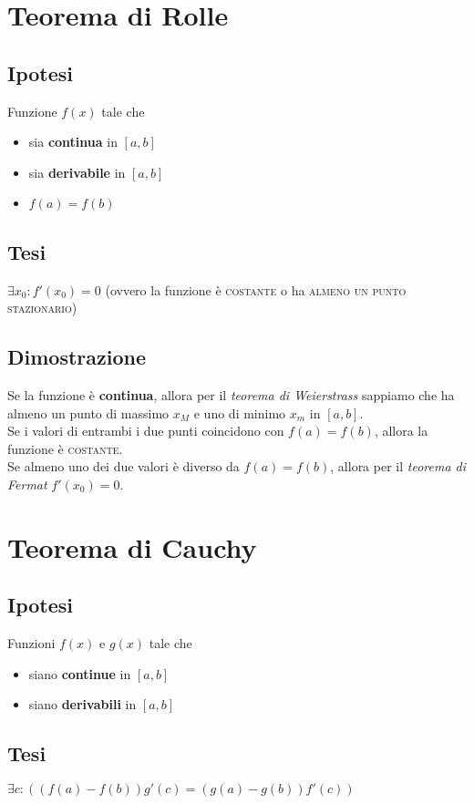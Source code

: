 \documentclass{article}
\begin{document}
\section{Teorema di Rolle}

\begin{multicols}{2}
    \subsection{Ipotesi}
    Funzione \(f(x)\) tale che
    \begin{itemize}
        \item sia \textbf{continua} in \([a, b]\)
        \item sia \textbf{derivabile} in \([a, b]\)
        \item \(f(a) = f(b)\)    
    \end{itemize}
\columnbreak
    \subsection{Tesi}
    \(\exists x_0 : f'(x_0) = 0\) (ovvero la funzione è \textsc{costante} o ha \textsc{almeno un punto stazionario})
\end{multicols}

\subsection{Dimostrazione}
Se la funzione è \textbf{continua}, allora per il \textit{teorema di Weierstrass} sappiamo che ha almeno un punto di massimo \(x_M\) e uno di minimo \(x_m\) in \([a, b]\).\\
Se i valori di entrambi i due punti coincidono con \(f(a) = f(b)\), allora la funzione è \textsc{costante}.\\
Se almeno uno dei due valori è diverso da \(f(a) = f(b)\), allora per il \textit{teorema di Fermat} \(f'(x_0) = 0\).

\newpage

\section{Teorema di Cauchy}

\begin{multicols}{2}
    \subsection{Ipotesi}
    Funzioni \(f(x)\) e \(g(x)\) tale che
    \begin{itemize}
        \item siano \textbf{continue} in \([a, b]\)
        \item siano \textbf{derivabili} in \([a, b]\)
    \end{itemize}
\columnbreak
    \subsection{Tesi}
    \(\exists c : ((f(a) - f(b))g'(c) = (g(a) - g(b))f'(c))\)
\end{multicols}
\end{document}
